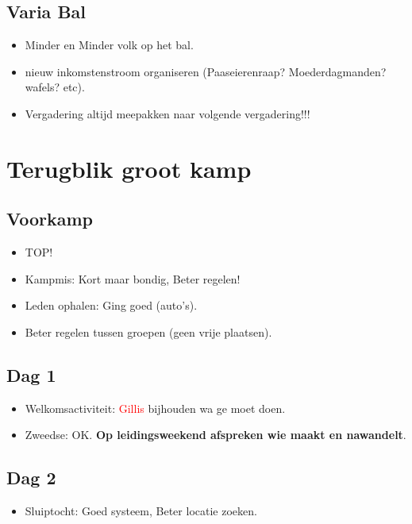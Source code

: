 \documentclass[pdftex,12pt,a4paper,english,titlepage]{article}
\begin{document}
\subsection{Varia Bal}
\begin{itemize}
	\item Minder en Minder volk op het bal.
	\item nieuw inkomstenstroom organiseren (Paaseierenraap? Moederdagmanden? wafels? etc).
	\item Vergadering altijd meepakken naar volgende vergadering!!!
\end{itemize}

\section{Terugblik groot kamp}

\subsection{Voorkamp}
\begin{itemize}
	\item TOP!
	\item Kampmis: Kort maar bondig, Beter regelen!
	\item Leden ophalen: Ging goed (auto's).
	\item Beter regelen tussen groepen (geen vrije plaatsen).
\end{itemize}

\subsection{Dag 1}
\begin{itemize}
	\item Welkomsactiviteit: \textcolor{red}{Gillis} bijhouden wa ge moet doen.
	\item Zweedse: OK. \textbf{Op leidingsweekend afspreken wie maakt en nawandelt}.
\end{itemize}

\subsection{Dag 2}
\begin{itemize}
	\item Sluiptocht: Goed systeem, Beter locatie zoeken.
\end{itemize}
\end{document}
